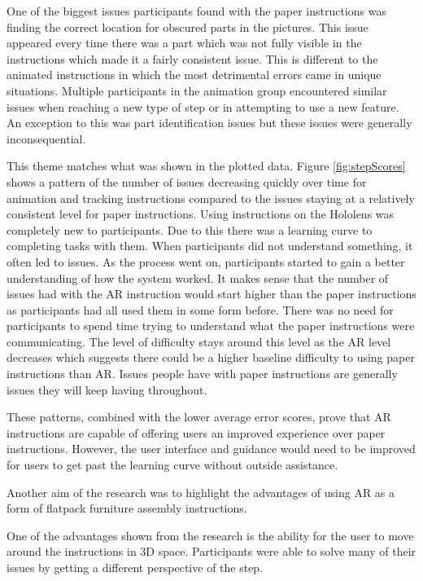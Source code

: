 \documentclass{l4proj}
\begin{document}
One of the biggest issues participants found with the paper instructions was finding the correct location for obscured parts in the pictures. This issue appeared every time there was a part which was not fully visible in the instructions which made it a fairly consistent issue. This is different to the animated instructions in which the most detrimental errors came in unique situations. Multiple participants in the animation group encountered similar issues when reaching a new type of step or in attempting to use a new feature. An exception to this was part identification issues but these issues were generally inconsequential. 

This theme matches what was shown in the plotted data. Figure \ref{fig:stepScores} shows a pattern of the number of issues decreasing quickly over time for animation and tracking instructions compared to the issues staying at a relatively consistent level for paper instructions. Using instructions on the Hololens was completely new to participants. Due to this there was a learning curve to completing tasks with them. When participants did not understand something, it often led to issues. As the process went on, participants started to gain a better understanding of how the system worked. It makes sense that the number of issues had with the AR instruction would start higher than the paper instructions as participants had all used them in some form before. There was no need for participants to spend time trying to understand what the paper instructions were communicating. The level of difficulty stays around this level as the AR level decreases which suggests there could be a higher baseline difficulty to using paper instructions than AR. Issues people have with paper instructions are generally issues they will keep having throughout.

These patterns, combined with the lower average error scores, prove that AR instructions are capable of offering users an improved experience over paper instructions. However, the user interface and guidance would need to be improved for users to get past the learning curve without outside assistance.

Another aim of the research was to highlight the advantages of using AR as a form of flatpack furniture assembly instructions.

One of the advantages shown from the research is the ability for the user to move around the instructions in 3D space. Participants were able to solve many of their issues by getting a different perspective of the step. 
\end{document}
